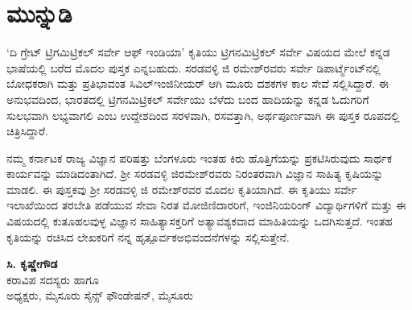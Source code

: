 
\chapter*{ಮುನ್ನುಡಿ}

‘ದಿ ಗ್ರೇಟ್​ ಟ್ರಿಗಮಿಟ್ರಿಕಲ್​ ಸರ್ವೇ ಆಫ್​ ಇಂಡಿಯಾ’ ಕೃತಿಯು ಟ್ರಿಗನಮಿಟ್ರಿಕಲ್​ ಸರ್ವೇ ವಿಷಯದ ಮೇಲೆ ಕನ್ನಡ ಭಾಷೆಯಲ್ಲಿ ಬರೆದ ಮೊದಲ ಪುಸ್ತಕ ಎನ್ನಬಹುದು. ಸರಡವಳ್ಳಿ ಜಿ ರಮೇಶ್​ರವರು ಸರ್ವೇ ಡಿಪಾರ್ಟ್ಮೆಂಟ್​ನಲ್ಲಿ ಬೋಧಕರಾಗಿ ಮತ್ತು ಪ್ರತಿಭಾವಂತ ಸಿವಿಲ್​\break ಇಂಜಿನೀಯರ್​ ಆಗಿ ಮೂರು ದಶಕಗಳ ಕಾಲ ಸೇವೆ ಸಲ್ಲಿಸಿದ್ದಾರೆ. ಈ ಅನುಭವದಿಂದ, ಭಾರತದಲ್ಲಿ ಟ್ರಿಗನಮಿಟ್ರಿಕಲ್​ ಸರ್ವೇಯು ಬೆಳೆದು ಬಂದ ಹಾದಿಯನ್ನು ಕನ್ನಡ ಓದುಗರಿಗೆ ಸುಲಭವಾಗಿ ಲಭ್ಯವಾಗಲಿ ಎಂಬ ಉದ್ದೇಶದಿಂದ ಸರಳವಾಗಿ, ರಸವತ್ತಾಗಿ, ಅರ್ಥಪೂರ್ಣವಾಗಿ ಈ ಪುಸ್ತಕ ರೂಪದಲ್ಲಿ ಚಿತ್ರಿಸಿದ್ದಾರೆ.

ನಮ್ಮ ಕರ್ನಾಟಕ ರಾಜ್ಯ ವಿಜ್ಞಾನ ಪರಿಷತ್ತು ಬೆಂಗಳೂರು ಇಂತಹ ಕಿರು ಹೊತ್ತಿಗೆಯನ್ನು ಪ್ರಕಟಿಸಿರುವುದು ಸಾರ್ಥಕ ಕಾರ್ಯವನ್ನು ಮಾಡಿದಂತಾಗಿದೆ. ಶ‍್ರೀ ಸರಡವಳ್ಳಿ ಜಿ\break ರಮೇಶ್​ರವರು ನಿರಂತರವಾಗಿ ವಿಜ್ಞಾನ ಸಾಹಿತ್ಯ ಕೃಷಿಯನ್ನು ಮಾಡಲಿ. ಈ ಪುಸ್ತಕವು ಶ‍್ರೀ ಸರಡವಳ್ಳಿ ಜಿ ರಮೇಶ್​ರವರ ಮೊದಲ ಕೃತಿಯಾಗಿದೆ. ಈ ಕೃತಿಯು ಸರ್ವೇ ಇಲಾಖೆಯಿಂದ ತರಬೇತಿ ಪಡೆಯುವ ಸೇವಾ ನಿರತ ಮೋಜಿಣಿದಾರರಿಗೆ, ಇಂಜಿನಿಯರಿಂಗ್​ ವಿದ್ಯಾರ್ಥಿ\-ಗಳಿಗೆ ಮತ್ತು ಈ ವಿಷಯದಲ್ಲಿ ಕುತೂಹಲವುಳ್ಳ ವಿಜ್ಞಾನ ಸಾಹಿತ್ಯಾಸಕ್ತರಿಗೆ ಅತ್ಯಾವಶ್ಯಕವಾದ ಮಾಹಿತಿಯನ್ನು ಒದಗಿಸುತ್ತದೆ. ಇಂತಹ ಕೃತಿಯನ್ನು ರಚಿಸಿದ ಲೇಖಕರಿಗೆ ನನ್ನ ಹೃತ್ಪೂರ್ವಕ\break ಅಭಿವಂದನೆಗಳನ್ನು ಸಲ್ಲಿಸುತ್ತೇನೆ.

\bigskip

\begin{flushright}
\textbf{ಸಿ. ಕೃಷ್ಣೇಗೌಡ}\\ ಕರಾವಿಪ ಸದಸ್ಯರು ಹಾಗೂ \\ ಅಧ್ಯಕ್ಷರು, ಮೈಸೂರು ಸೈನ್ಸ್ ಫೌಂಡೇಷನ್, ಮೈಸೂರು
\end{flushright}

